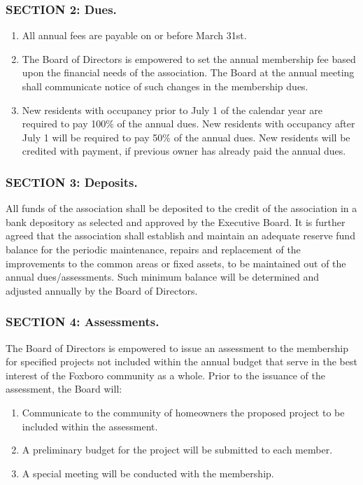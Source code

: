 \subsubsection{SECTION 2: Dues.}

\begin{enumerate}[label=\alph*)]
\item All annual fees are payable on or before March 31st.
\item The Board of
Directors is empowered to set the annual membership fee based upon the
financial needs of the association. The Board at the annual meeting
shall communicate notice of such changes in the membership dues.

\item New residents with occupancy prior to July 1 of the calendar year are
required to pay 100\% of the annual dues. New residents with occupancy
after July 1 will be required to pay 50\% of the annual dues. New
residents will be credited with payment, if previous owner has already
paid the annual dues.
\end{enumerate}


\subsubsection{SECTION 3: Deposits.}

All funds of the association shall be deposited to the credit of the
association in a bank depository as selected and approved by the Executive
Board. It is further agreed that the association shall establish and
maintain an adequate reserve fund balance for the periodic maintenance,
repairs and replacement of the improvements to the common areas or
fixed assets, to be maintained out of the annual dues/assessments. Such
minimum balance will be determined and adjusted annually by the Board
of Directors.

\subsubsection{SECTION 4: Assessments.}
The Board of Directors is empowered to issue an assessment to the
membership for specified projects not included within the annual budget
that serve in the best interest of the Foxboro community as a whole. Prior
to the issuance of the assessment, the Board will:

\begin{enumerate}[label=\alph*)]
\item Communicate to the community of homeowners the proposed project to be
included within the assessment.
\item A preliminary budget for the project
will be submitted to each member.
\item A special meeting will be conducted with the membership.
\end{enumerate}

